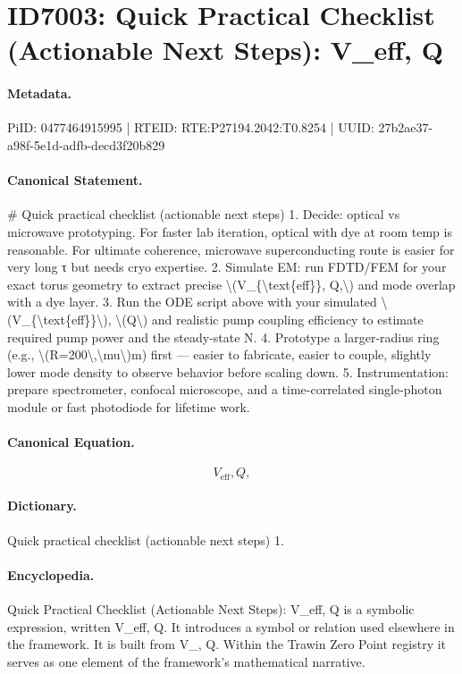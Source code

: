 \section*{ID7003: Quick Practical Checklist (Actionable Next Steps): V\_eff, Q}
\paragraph{Metadata.}
PiID: 0477464915995 | RTEID: RTE:P27194.2042:T0.8254 | UUID: 27b2ae37-a98f-5e1d-adfb-decd3f20b829

\paragraph{Canonical Statement.}
\# Quick practical checklist (actionable next steps) 1. Decide: optical vs microwave prototyping. For faster lab iteration, optical with dye at room temp is reasonable. For ultimate coherence, microwave superconducting route is easier for very long τ but needs cryo expertise. 2. Simulate EM: run FDTD/FEM for your exact torus geometry to extract precise \textbackslash{}(V\_\{\textbackslash{}text\{eff\}\}, Q,\textbackslash{}) and mode overlap with a dye layer. 3. Run the ODE script above with your simulated \textbackslash{}(V\_\{\textbackslash{}text\{eff\}\}\textbackslash{}), \textbackslash{}(Q\textbackslash{}) and realistic pump coupling efficiency to estimate required pump power and the steady-state N. 4. Prototype a larger-radius ring (e.g., \textbackslash{}(R=200\textbackslash{},\textbackslash{}mu\textbackslash{})m) first — easier to fabricate, easier to couple, slightly lower mode density to observe behavior before scaling down. 5. Instrumentation: prepare spectrometer, confocal microscope, and a time-correlated single-photon module or fast photodiode for lifetime work.

\paragraph{Canonical Equation.}
\[
V_{\text{eff}}, Q,
\]

\paragraph{Dictionary.}
Quick practical checklist (actionable next steps) 1.

\paragraph{Encyclopedia.}
Quick Practical Checklist (Actionable Next Steps): V\_eff, Q is a symbolic expression, written V\_eff, Q. It introduces a symbol or relation used elsewhere in the framework. It is built from V\_, Q. Within the Trawin Zero Point registry it serves as one element of the framework's mathematical narrative.
